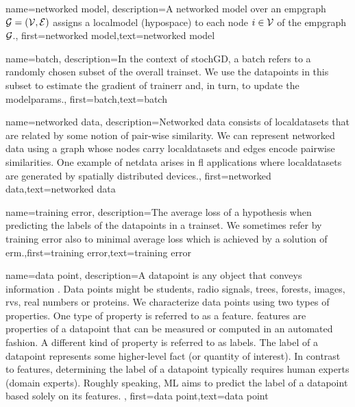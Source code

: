 {name={networked model},
  description={A networked model over an \gls{empgraph} $\mathcal{G} = \left( \mathcal{V},\mathcal{E} \right)$ assigns 
   a \gls{localmodel} (\gls{hypospace}) to each node $i \in \mathcal{V}$ of the \gls{empgraph} $\mathcal{G}$.}, 
   first={networked model},text={networked model}  
}

{
	name={batch},
	description={In the context of \gls{stochGD}, a batch refers to a randomly 
	chosen subset of the overall \gls{trainset}. We use the \gls{datapoint}s in this subset 
	to estimate the \gls{gradient} of \gls{trainerr} and, in turn, to update the \gls{modelparams}.}, 
	first={batch},text={batch}  
}

{
	name={networked data},
	description={Networked data consists of \gls{localdataset}s 
	that are related by some notion of pair-wise similarity. We can represent networked 
	data using a \gls{graph} whose nodes carry \gls{localdataset}s and edges encode 
	pairwise similarities. One example of \gls{netdata} arises in \gls{fl} applications 
	where \gls{localdataset}s are generated by spatially distributed devices.}, 
	first={networked data},text={networked data}  
}

{
	name={training error},
	description={The average \gls{loss} of a \gls{hypothesis} when 
		predicting the \gls{label}s of the \gls{datapoint}s in a \gls{trainset}. 
		We sometimes refer by training error also to minimal average \gls{loss} 
		which is achieved by a solution of \gls{erm}.},first={training error},text={training error}  
}

{name={data point},
description={A \gls{datapoint} is any object that conveys information \cite{coverthomas}. Data points might be 
		students, radio signals, trees, forests, images, \gls{rv}s, real numbers or proteins. We characterize data points 
		using two types of properties. One type of property is referred to as a \gls{feature}. \Gls{feature}s are properties of a 
		\gls{datapoint} that can be measured or computed in an automated fashion. 
		A different kind of property is referred to as \gls{label}s. The \gls{label} of 
		a \gls{datapoint} represents some higher-level fact (or quantity of interest). In 
		contrast to \gls{feature}s, determining the \gls{label} of a \gls{datapoint} typically 
		requires human experts (domain experts). Roughly speaking, ML aims to predict 
		the \gls{label} of a \gls{datapoint} based solely on its \gls{feature}s. 
		}, first={data point},text={data point}  
}


